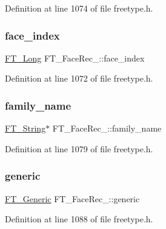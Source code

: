 Definition at line 1074 of file freetype.\+h.

\mbox{\label{struct_f_t___face_rec___ab9a5640eb25bd3c743b3d725edd68a87}} 
\subsubsection{\texorpdfstring{face\_index}{face\_index}}
{\footnotesize\ttfamily \mbox{\hyperlink{fttypes_8h_a7fa72a1f0e79fb1860c5965789024d6f}{F\+T\+\_\+\+Long}} F\+T\+\_\+\+Face\+Rec\+\_\+\+::face\+\_\+index}



Definition at line 1072 of file freetype.\+h.

\mbox{\label{struct_f_t___face_rec___ae07b64a64466aa7ae2b9066e9336ac8b}} 
\subsubsection{\texorpdfstring{family\_name}{family\_name}}
{\footnotesize\ttfamily \mbox{\hyperlink{fttypes_8h_a9846214585359eb2ba6bbb0e6de30639}{F\+T\+\_\+\+String}}$\ast$ F\+T\+\_\+\+Face\+Rec\+\_\+\+::family\+\_\+name}



Definition at line 1079 of file freetype.\+h.

\mbox{\label{struct_f_t___face_rec___aaba29e9164f9c283348c8991f088a114}} 
\subsubsection{\texorpdfstring{generic}{generic}}
{\footnotesize\ttfamily \mbox{\hyperlink{fttypes_8h_ae15e8550dd7d863328686aadaead5c77}{F\+T\+\_\+\+Generic}} F\+T\+\_\+\+Face\+Rec\+\_\+\+::generic}



Definition at line 1088 of file freetype.\+h.

\mbox{\label{struct_f_t___face_rec___aea701e6584693e684acf300edb28d8f6}} 
